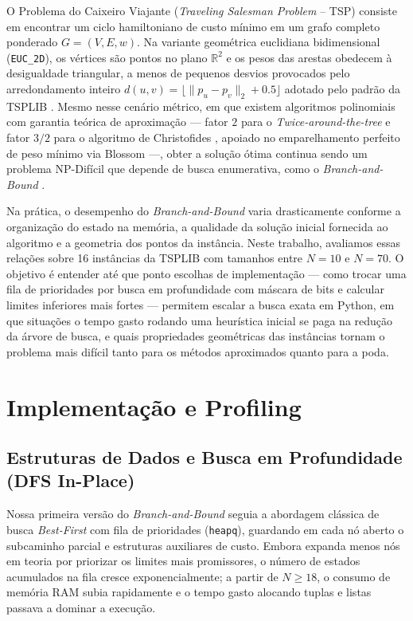 \documentclass[12pt]{article}
\begin{document}
O Problema do Caixeiro Viajante (\textit{Traveling Salesman Problem} -- TSP) consiste em encontrar um ciclo hamiltoniano de custo mínimo em um grafo completo ponderado $G = (V, E, w)$. Na variante geométrica euclidiana bidimensional (\texttt{EUC\_2D}), os vértices são pontos no plano $\mathbb{R}^2$ e os pesos das arestas obedecem à desigualdade triangular, a menos de pequenos desvios provocados pelo arredondamento inteiro $d(u,v) = \lfloor \| p_u - p_v \|_2 + 0.5 \rfloor$ adotado pelo padrão da TSPLIB \cite{reinelt1991tsplib}. Mesmo nesse cenário métrico, em que existem algoritmos polinomiais com garantia teórica de aproximação — fator $2$ para o \textit{Twice-around-the-tree} \cite{cormen2022introduction} e fator $3/2$ para o algoritmo de Christofides \cite{christofides1976worst}, apoiado no emparelhamento perfeito de peso mínimo via Blossom \cite{edmonds1965paths} —, obter a solução ótima continua sendo um problema NP-Difícil que depende de busca enumerativa, como o \textit{Branch-and-Bound} \cite{held1970traveling}.

Na prática, o desempenho do \textit{Branch-and-Bound} varia drasticamente conforme a organização do estado na memória, a qualidade da solução inicial fornecida ao algoritmo e a geometria dos pontos da instância. Neste trabalho, avaliamos essas relações sobre 16 instâncias da TSPLIB com tamanhos entre $N = 10$ e $N = 70$. O objetivo é entender até que ponto escolhas de implementação — como trocar uma fila de prioridades por busca em profundidade com máscara de bits e calcular limites inferiores mais fortes — permitem escalar a busca exata em Python, em que situações o tempo gasto rodando uma heurística inicial se paga na redução da árvore de busca, e quais propriedades geométricas das instâncias tornam o problema mais difícil tanto para os métodos aproximados quanto para a poda.

\section{Implementação e Profiling}

\subsection{Estruturas de Dados e Busca em Profundidade (DFS In-Place)}

Nossa primeira versão do \textit{Branch-and-Bound} seguia a abordagem clássica de busca \textit{Best-First} com fila de prioridades (\texttt{heapq}), guardando em cada nó aberto o subcaminho parcial e estruturas auxiliares de custo. Embora expanda menos nós em teoria por priorizar os limites mais promissores, o número de estados acumulados na fila cresce exponencialmente; a partir de $N \ge 18$, o consumo de memória RAM subia rapidamente e o tempo gasto alocando tuplas e listas passava a dominar a execução.
\end{document}
